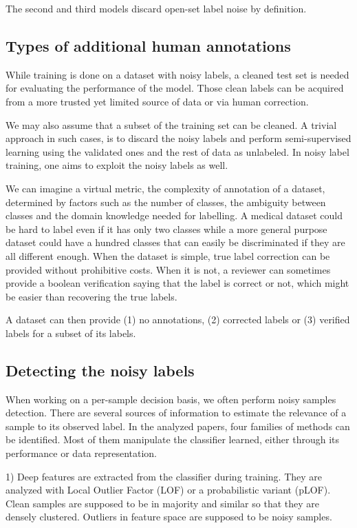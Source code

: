 The second and third models discard open-set label noise by definition.

\subsection{Types of additional human annotations}
\label{annotations}

While training is done on a dataset with noisy labels, a cleaned test set is needed for evaluating the performance of the model. Those clean labels can be acquired from a more trusted yet limited source of data or via human correction.

We may also assume that a subset of the training set can be cleaned. A trivial approach in such cases, is to discard the noisy labels and perform semi-supervised learning using the validated ones and the rest of data as unlabeled. In noisy label training, one aims to exploit the noisy labels as well.

We can imagine a virtual metric, the complexity of annotation of a dataset, determined by factors such as the number of classes, the ambiguity between classes and the domain knowledge needed for labelling. A medical dataset could be hard to label even if it has only two classes while a more general purpose dataset could have a hundred classes that can easily be discriminated if they are all different enough. When the dataset is simple, true label correction can be provided without prohibitive costs.  When it is not, a reviewer can sometimes provide a boolean verification saying that the label is correct or not, which might be easier than recovering the true labels.

A dataset can then provide (1) no annotations, (2) corrected labels or (3) verified labels for a subset of its labels.

\subsection{Detecting the noisy labels}
\label{detection}

When working on a per-sample decision basis, we often perform noisy samples detection. There are several sources of information to estimate the relevance of a sample to its observed label. In the analyzed papers, four families of methods can be identified. Most of them manipulate the classifier learned, either through its performance or data representation.

1) Deep features are extracted from the classifier during training. They are analyzed with Local Outlier Factor (LOF) \citep{LOF} or a probabilistic variant (pLOF). Clean samples are supposed to be in majority and similar so that they are densely clustered. Outliers in feature space are supposed to be noisy samples.

